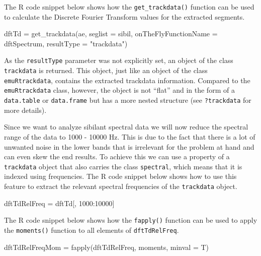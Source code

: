 \documentclass[
]{book}
\newenvironment{Shaded}{\begin{snugshade}}{\end{snugshade}}
\newcommand{\AttributeTok}[1]{\textcolor[rgb]{0.77,0.63,0.00}{#1}}
\newcommand{\DecValTok}[1]{\textcolor[rgb]{0.00,0.00,0.81}{#1}}
\newcommand{\FunctionTok}[1]{\textcolor[rgb]{0.00,0.00,0.00}{#1}}
\newcommand{\NormalTok}[1]{#1}
\newcommand{\OtherTok}[1]{\textcolor[rgb]{0.56,0.35,0.01}{#1}}
\newcommand{\SpecialCharTok}[1]{\textcolor[rgb]{0.00,0.00,0.00}{#1}}
\newcommand{\StringTok}[1]{\textcolor[rgb]{0.31,0.60,0.02}{#1}}
\begin{document}
The R code snippet below shows how the \texttt{get\_trackdata()} function can be used to calculate the Discrete Fourier Transform values for the extracted segments.

\begin{Shaded}
\begin{Highlighting}[]
\NormalTok{dftTd }\OtherTok{=} \FunctionTok{get\_trackdata}\NormalTok{(ae,}
                      \AttributeTok{seglist =}\NormalTok{ sibil,}
                      \AttributeTok{onTheFlyFunctionName =} \StringTok{\textquotesingle{}dftSpectrum\textquotesingle{}}\NormalTok{,}
                      \AttributeTok{resultType =} \StringTok{"trackdata"}\NormalTok{)}
\end{Highlighting}
\end{Shaded}

As the \texttt{resultType} parameter was not explicitly set, an object of the class \texttt{trackdata} is returned. This object, just like an object of the class \texttt{emuRtrackdata}, contains the extracted trackdata information. Compared to the \texttt{emuRtrackdata} class, however, the object is not ``flat'' and in the form of a \texttt{data.table} or \texttt{data.frame} but has a more nested structure (see \texttt{?trackdata} for more details).

Since we want to analyze sibilant spectral data we will now reduce the spectral range of the data to 1000 - 10000 Hz. This is due to the fact that there is a lot of unwanted noise in the lower bands that is irrelevant for the problem at hand and can even skew the end results. To achieve this we can use a property of a \texttt{trackdata} object that also carries the class \texttt{spectral}, which means that it is indexed using frequencies. The R code snippet below shows how to use this feature to extract the relevant spectral frequencies of the \texttt{trackdata} object.

\begin{Shaded}
\begin{Highlighting}[]
\NormalTok{dftTdRelFreq }\OtherTok{=}\NormalTok{ dftTd[, }\DecValTok{1000}\SpecialCharTok{:}\DecValTok{10000}\NormalTok{]}
\end{Highlighting}
\end{Shaded}

The R code snippet below shows how the \texttt{fapply()} function can be used to apply the \texttt{moments()} function to all elements of \texttt{dftTdRelFreq}.

\begin{Shaded}
\begin{Highlighting}[]
\NormalTok{dftTdRelFreqMom }\OtherTok{=} \FunctionTok{fapply}\NormalTok{(dftTdRelFreq, moments, }\AttributeTok{minval =}\NormalTok{ T)}
\end{Highlighting}
\end{Shaded}
\end{document}

